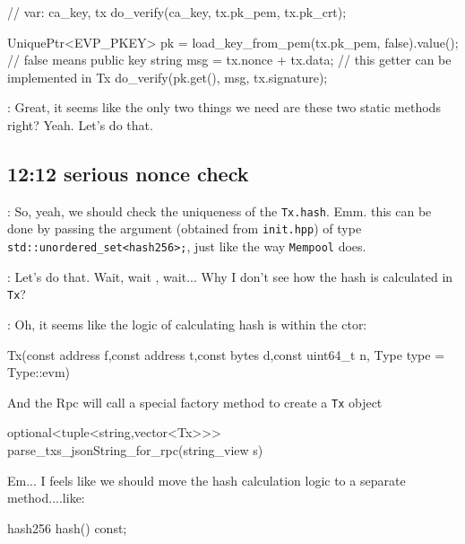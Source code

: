 \documentclass[dvipsnames]{article}
\begin{document}
\begin{simplec}
// var: ca_key, tx
do_verify(ca_key, tx.pk_pem, tx.pk_crt);

UniquePtr<EVP_PKEY> pk = load_key_from_pem(tx.pk_pem, false).value(); // false means public key
string msg = tx.nonce + tx.data; // this getter can be implemented in Tx
do_verify(pk.get(), msg, tx.signature);
\end{simplec}

 : Great, it seems like the only two things we need are these two
static methods right? Yeah. Let's do that.

\subsection*{12:12 serious nonce check}


 : So, yeah, we should check the uniqueness of the
\texttt{Tx.hash}. Emm. this can be done by passing the argument (obtained from
\texttt{init.hpp}) of type \texttt{std::unordered\_set<hash256>;}, just like the
way \texttt{Mempool} does.

 : Let's do that. Wait, wait , wait... Why I don't see how the
hash is calculated in \texttt{Tx}?

 : Oh, it seems like the logic of calculating hash is within the ctor:

\begin{simplec}
Tx(const address f,const address t,const bytes d,const uint64_t n, Type type = Type::evm)
\end{simplec}

And the Rpc will call a special factory method to create a \texttt{Tx} object

\begin{simplec}
optional<tuple<string,vector<Tx>>> parse_txs_jsonString_for_rpc(string_view s)
\end{simplec}

Em... I feels like we should move the hash calculation logic to a separate
method....like:
\begin{simplec}
hash256 hash() const;
\end{simplec}
\end{document}
